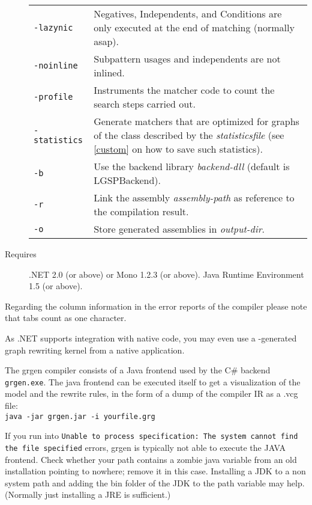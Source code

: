 \begin{description}
\begin{tabularx}{\linewidth}{lX}
      \texttt{-lazynic} & Negatives, Independents, and Conditions are only executed at the end of matching (normally asap).\\
      \texttt{-noinline} & Subpattern usages and independents are not inlined.\\
      \texttt{-profile} & Instruments the matcher code to count the search steps carried out.\\
      \texttt{-statistics} & Generate matchers that are optimized for graphs of the class described by the \emph{statisticsfile} (see \ref{custom} on how to save such statistics).\\
      \texttt{-b} & Use the backend library \emph{backend-dll} (default is LGSPBackend).\\
      \texttt{-r} & Link the assembly \emph{assembly-path} as reference to the compilation result.\\
      \texttt{-o} & Store generated assemblies in \emph{output-dir}.
    \end{tabularx}
  \item[Requires] .NET 2.0 (or above) or Mono 1.2.3 (or above). Java Runtime Environment 1.5 (or above).
\end{description}

\begin{note}
Regarding the column information in the error reports of the compiler please note that tabs count as one character.
\end{note}

\begin{note}
As .NET supports integration with native code, you may even use a \GrG-generated graph rewriting kernel from a native application.
\end{note}

\begin{note}\label{note:modelruledump}
The grgen compiler consists of a Java frontend used by the C\# backend \texttt{grgen.exe}.
The java frontend can be executed itself to get a visualization of the model and the rewrite rules,
in the form of a dump of the compiler IR as a .vcg file:\\
\texttt{java -jar grgen.jar -i yourfile.grg}
\end{note}

\begin{note}
If you run into \texttt{Unable to process specification: The system cannot find the file specified} errors, 
grgen is typically not able to execute the JAVA frontend.
Check whether your path contains a zombie java variable from an old installation pointing to nowhere; remove it in this case.
Installing a JDK to a non system path and adding the bin folder of the JDK to the path variable may help.
(Normally just installing a JRE is sufficient.)
\end{note}

